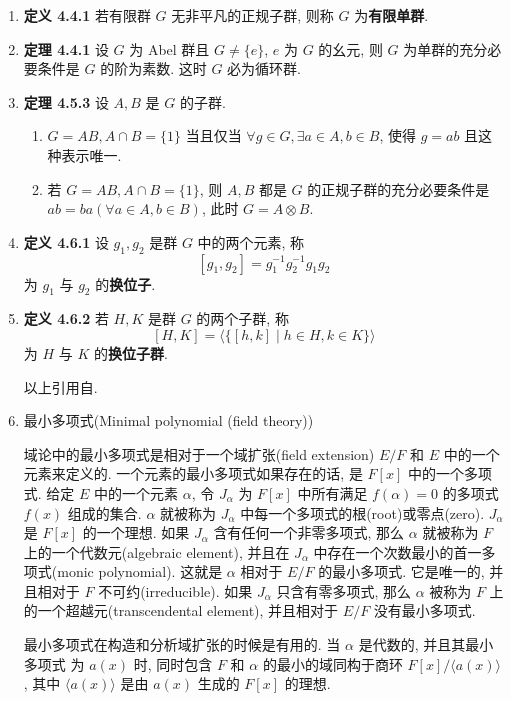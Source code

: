 \documentclass[UTF8]{ctexart}
\begin{document}
\begin{enumerate}
\item \textbf{定义 4.4.1} 若有限群 $G$ 无非平凡的正规子群, 则称 $G$ 为\textbf{有限单群}.

\item \textbf{定理 4.4.1} 设 $G$ 为 Abel 群且 $G\neq\{e\}$, $e$ 为 $G$ 的幺元, 则 $G$ 为单群的充分必要条件是 $G$ 的阶为素数. 这时 $G$ 必为循环群.

\item \textbf{定理 4.5.3} 设 $A,B$ 是 $G$ 的子群.
\begin{enumerate}
  \item $G=AB,A\cap B=\{1\}$ 当且仅当 $\forall g\in G, \exists a\in A,b\in B$, 使得 $g=ab$ 且这种表示唯一.
  \item 若 $G=AB, A\cap B=\{1\}$, 则 $A,B$ 都是 $G$ 的正规子群的充分必要条件是 $ab=ba(\forall a\in A,b\in B)$, 此时 $G=A\otimes B$.
\end{enumerate}

\item \textbf{定义 4.6.1} 设 $g_1,g_2$ 是群 $G$ 中的两个元素, 称
\[
[g_1,g_2] = g_1^{-1}g_2^{-1}g_1g_2
\]
为 $g_1$ 与 $g_2$ 的\textbf{换位子}.

\item \textbf{定义 4.6.2} 若 $H,K$ 是群 $G$ 的两个子群, 称
\[
[H,K] = \langle\{[h,k]\mid h\in H,k\in K\}\rangle
\]
为 $H$ 与 $K$ 的\textbf{换位子群}.

以上引用自\parencite{孟道骥2010抽象代数}.

\noindent\makebox[\linewidth]{\rule{\paperwidth}{0.4pt}}

\item 最小多项式(Minimal polynomial (field theory))

域论中的最小多项式是相对于一个域扩张(field extension) $E/F$ 和 $E$ 中的一个元素来定义的. 一个元素的最小多项式如果存在的话, 是 $F[x]$ 中的一个多项式. 给定 $E$ 中的一个元素 $\alpha$, 令 $J_\alpha$ 为 $F[x]$ 中所有满足 $f(\alpha) = 0$ 的多项式 $f(x)$ 组成的集合. $\alpha$ 就被称为 $J_\alpha$ 中每一个多项式的根(root)或零点(zero). $J_\alpha$ 是 $F[x]$ 的一个理想. 如果 $J_\alpha$ 含有任何一个非零多项式, 那么 $\alpha$ 就被称为 $F$ 上的一个代数元(algebraic element), 并且在 $J_\alpha$ 中存在一个次数最小的首一多项式(monic polynomial). 这就是 $\alpha$ 相对于 $E/F$ 的最小多项式. 它是唯一的, 并且相对于 $F$ 不可约(irreducible). 如果 $J_\alpha$ 只含有零多项式, 那么 $\alpha$ 被称为 $F$ 上的一个超越元(transcendental element), 并且相对于 $E/F$ 没有最小多项式.

最小多项式在构造和分析域扩张的时候是有用的. 当 $\alpha$ 是代数的, 并且其最小多项式 为 $a(x)$ 时, 同时包含 $F$ 和 $\alpha$ 的最小的域同构于商环 $F[x]/\langle a(x)\rangle$, 其中 $\langle a(x)\rangle$ 是由 $a(x)$ 生成的 $F[x]$ 的理想.


\end{enumerate}
\end{document}
